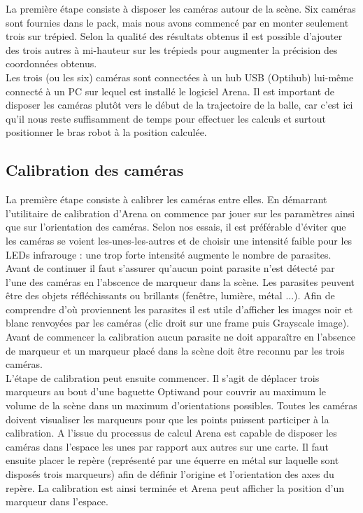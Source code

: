 \documentclass{article}[11pt]
\begin{document}
La première étape consiste à disposer les caméras autour de la scène. Six caméras sont fournies dans le pack, mais nous avons commencé par en monter seulement trois sur trépied. Selon la qualité des résultats obtenus il est possible d'ajouter des trois autres à mi-hauteur sur les trépieds pour augmenter la précision des coordonnées obtenus. \\

Les trois (ou les six) caméras sont connectées à un hub USB (Optihub) lui-même connecté à un PC sur lequel est installé le logiciel Arena. Il est important de disposer les caméras plutôt vers le début de la trajectoire de la balle, car c'est ici qu'il nous reste suffisamment de temps pour effectuer les calculs et surtout positionner le bras robot à la position calculée. \\

\subsection{Calibration des caméras}

La première étape consiste à calibrer les caméras entre elles. En démarrant l'utilitaire de calibration d'Arena on commence par jouer sur les paramètres ainsi que sur l'orientation des caméras. Selon nos essais, il est préférable d'éviter que les caméras se voient les-unes-les-autres et de choisir une intensité faible pour les LEDs infrarouge : une trop forte intensité augmente le nombre de parasites. Avant de continuer il faut s'assurer qu'aucun point parasite n'est détecté par l'une des caméras en l'abscence de marqueur dans la scène. Les parasites peuvent être des objets réfléchissants ou brillants (fenêtre, lumière, métal ...). Afin de comprendre d'où proviennent les parasites il est utile d'afficher les images noir et blanc renvoyées par les caméras (clic droit sur une frame puis Grayscale image). Avant de commencer la calibration aucun parasite ne doit apparaître en l'absence de marqueur et un marqueur placé dans la scène doit être reconnu par les trois caméras. \\

L'étape de calibration peut ensuite commencer. Il s'agit de déplacer trois marqueurs au bout d'une baguette Optiwand pour couvrir au maximum le volume de la scène dans un maximum d'orientations possibles. Toutes les caméras doivent visualiser les marqueurs pour que les points puissent participer à la calibration. A l'issue du processus de calcul Arena est capable de disposer les caméras dans l'espace les unes par rapport aux autres sur une carte. 
\newpage
Il faut ensuite placer le repère (représenté par une équerre en métal sur laquelle sont disposés trois marqueurs) afin de définir l'origine et l'orientation des axes du repère. La calibration est ainsi terminée et Arena peut afficher la position d'un marqueur dans l'espace.\\
\end{document}
